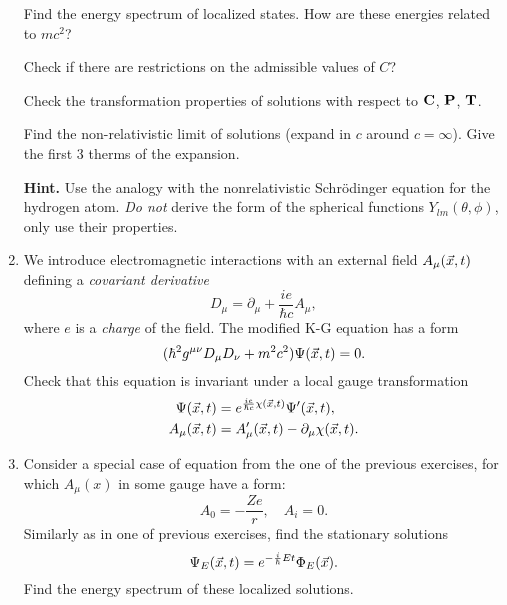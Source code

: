 \documentclass[a4paper,11pt]{article}
\begin{document}
\begin{enumerate}
  Find the energy spectrum of localized states. How are these energies
  related to $m c^{ 2 }$?

  Check if there are restrictions on the admissible values of $C$?

  Check the transformation properties of solutions with respect to
  $\mathbf{C}$, $\mathbf{P}$, $\mathbf{T}$.

  Find the non-relativistic limit of solutions (expand in $c$ around
  $c = \infty$). Give the first 3 therms of the expansion.

  \textbf{Hint.} Use the analogy with the nonrelativistic
  Schr\"{o}dinger equation for the hydrogen atom. \textit{Do not}
  derive the form of the spherical functions
  $Y_{ l m }( \theta, \phi )$, only use their properties.



\item We introduce electromagnetic interactions with an external field
  $A_{ \mu }( \vec{x}, t )$ defining a \textit{covariant derivative}
  \begin{equation}
    \label{eq:15}
    D_{ \mu } = \partial_{ \mu } + \frac{ i e }{ \hbar c } A_{ \mu },
  \end{equation}
  where $e$ is a \textit{charge} of the field. The modified K-G
  equation has a form
  \begin{equation}
    \label{eq:16}
    ( \hbar^{ 2 } g^{ \mu \nu } D_{ \mu } D_{ \nu } + m^{ 2 } c^{ 2 } ) \Psi( \vec{x}, t )
    = 0.
  \end{equation}
  Check that this equation is invariant under a local gauge
  transformation
  \begin{align}
    \Psi( \vec{x}, t )
    &= e^{ \frac{ i e }{ \hbar c } \chi( \vec{x}, t ) } \Psi'( \vec{x}, t ), \\
    A_{ \mu }( \vec{x}, t )
    &= A_{ \mu }'( \vec{x}, t ) - \partial_{ \mu } \chi( \vec{x}, t ).
  \end{align}



\item Consider a special case of equation from the one of the previous
  exercises, for which $A_{ \mu }( x )$ in some gauge have a form:
  \begin{equation}
    \label{eq:17}
    A_{ 0 } = -\frac{ Z e }{ r }, \quad
    A_{ i } = 0.
  \end{equation}
  Similarly as in one of previous exercises, find the stationary
  solutions
  \begin{equation}
    \label{eq:18}
    \Psi_{ E }( \vec{x}, t ) = e^{ -\frac{ i }{ \hbar } E t } \Phi_{ E }( \vec{x} ).
  \end{equation}
  Find the energy spectrum of these localized solutions.


\end{enumerate}
\end{document}
